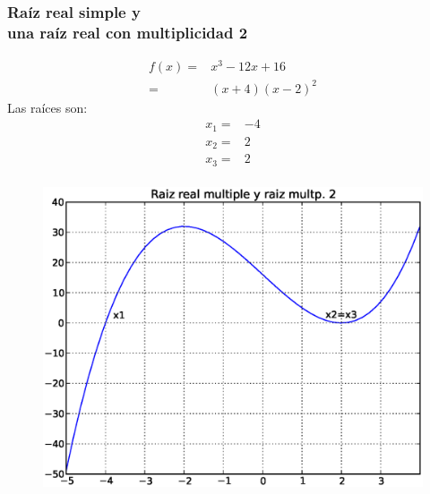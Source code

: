 \documentclass[12pt]{beamer}
\begin{document}
\begin{frame}[fragile]
\frametitle{Ra\'{i}z real simple y \\ una ra\'{i}z real con multiplicidad 2}
\begin{minipage}{5cm}
\fontsize{12}{12}\selectfont
\[ \begin{split}
f(x)=& x^{3} - 12x + 16 \\
=& (x+4)(x-2)^{2}
\end{split} \]
Las ra\'{i}ces son:
\[ \begin{split}
x_{1} =& -4 \\
x_{2} =& 2 \\
x_{3} =& 2 \\
\end{split}\]
\end{minipage}
\hspace{0.5cm}
\begin{minipage}{4.5cm}
\begin{figure}
	\centering
	\includegraphics[scale=0.3]{raices03.eps} 
\end{figure}
\end{minipage}
\end{frame}
\end{document}
